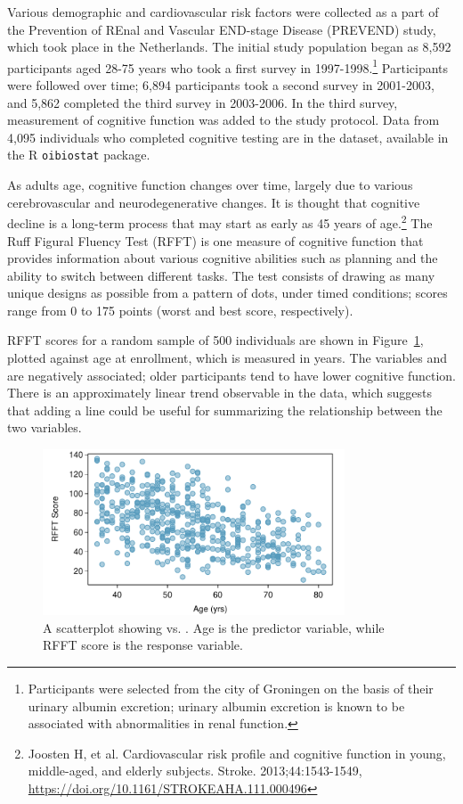 Various demographic and cardiovascular risk factors were collected as a part of the Prevention of REnal and Vascular END-stage Disease (PREVEND) study, which took place in the Netherlands. The initial study population began as 8,592 participants aged 28-75 years who took a first survey in 1997-1998.\footnote{Participants were selected from the city of Groningen on the basis of their urinary albumin excretion; urinary albumin excretion is known to be associated with abnormalities in renal function.} Participants were followed over time; 6,894 participants took a second survey in 2001-2003, and 5,862 completed the third survey in 2003-2006. In the third survey, measurement of cognitive function was added to the study protocol. Data from 4,095 individuals who completed cognitive testing are in the  dataset, available in the \textsf{R} \texttt{oibiostat} package. 

As adults age, cognitive function changes over time, largely due to various cerebrovascular and neurodegenerative changes. It is thought that cognitive decline is a long-term process that may start as early as 45 years of age.\footnote{Joosten H, et al. Cardiovascular risk profile and cognitive function in young, middle-aged, and elderly subjects. Stroke. 2013;44:1543-1549, \url{https://doi.org/10.1161/STROKEAHA.111.000496} } The Ruff Figural Fluency Test (RFFT) is one measure of cognitive function that provides information about various cognitive abilities such as planning and the ability to switch between different tasks. The test consists of drawing as many unique designs as possible from a pattern of dots, under timed conditions; scores range from 0 to 175 points (worst and best score, respectively).

RFFT scores for a random sample of 500 individuals are shown in Figure~\ref{statinsAgeRFFT}, plotted against age at enrollment, which is measured in years. The variables  and  are negatively associated; older participants tend to have lower cognitive function. There is an approximately linear trend observable in the data, which suggests that adding a line could be useful for summarizing the relationship between the two variables.

\begin{figure}[h!]
	\centering
	\includegraphics[width=0.8\textwidth]
	{ch_simple_linear_regression_oi_biostat/figures/statinsAgeRFFTPlot/statinsAgeRFFTPlot}
	\caption{A scatterplot showing  vs. . Age is the predictor variable, while RFFT score is the response variable.}
	\label{statinsAgeRFFT}
\end{figure}

